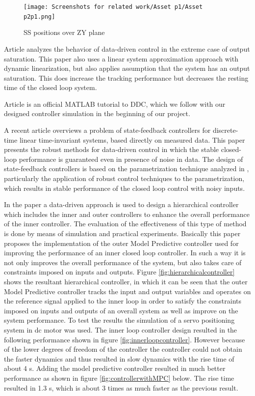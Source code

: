 \documentclass[]{final_report}
\begin{document}
\begin{figure} [h!]
\centerline{\texttt{[image: Screenshots for related work/Asset p1/Asset p2p1.png]}}
\caption{SS positions over ZY plane
\cite{rosolia2018a}}
\label{fig:p2p1}
\end{figure}


Article \cite{bu2018a} analyzes the behavior of data-driven control in the extreme case of output saturation. This paper also uses a linear system approximation approach with dynamic linearization, but also applies assumption that the system has an output saturation. This does increase the tracking performance but decreases the resting time of the closed loop system. 

Article \cite{pravallika2021a} is an official MATLAB tutorial to DDC, which we follow with our designed controller simulation in the beginning of our project.

A recent article \cite{Berberich_2020} overviews a problem of state-feedback controllers for discrete-time linear time-invariant systems, based directly on measured data. This paper presents the robust methods for data-driven control in which the stable closed-loop performance is guaranteed even in presence of noise in data. The design of state-feedback controllers is based on the parametrization technique analyzed in \cite{de2019a}, particularly the application of robust control techniques to the parametrization, which results in stable performance of the closed loop control with noisy inputs.

In the paper \cite{piga2017direct} a data-driven approach is used to design a hierarchical controller which includes the inner and outer controllers to enhance the overall performance of the inner controller. The evaluation of the effectiveness of this type of method is done by means of simulation and practical experiments. Basically this paper proposes the implementation of the outer Model Predictive controller used for improving the performance of an inner closed loop controller. In such a way it is not only improves the overall performance of the system, but also takes care of constraints imposed on inputs and outputs. Figure \ref{fig:hierarchicalcontroller} shows the resultant hierarchical controller, in which it can be seen that the outer Model Predictive controller tracks the input and output variables and operates on the reference signal applied to the inner loop in order to satisfy the constraints imposed on inputs and outputs of an overall system as well as improve on the system performance. To test the results the simulation of a servo positioning system in dc motor was used. The inner loop controller design resulted in the following performance shown in figure \ref{fig:innerloopcontroller}. However because of the lower degrees of freedom of the controller the controller could not obtain the faster dynamics and thus resulted in slow dynamics with the rise time of about 4 s. Adding the model predictive controller resulted in much better performance as shown in figure \ref{fig:controllerwithMPC} below. The rise time resulted in 1.3 s, which is about 3 times as much faster as the previous result. 
\end{document}
